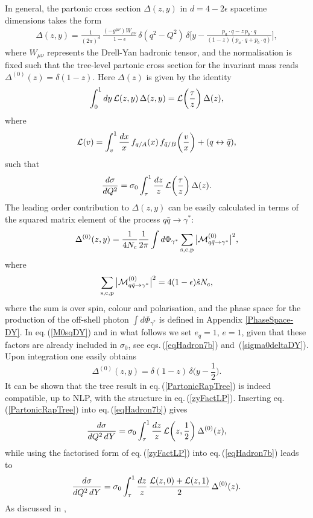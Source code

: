 \documentclass[11pt]{article}
\newcommand{\be}{\begin{equation}}
\newcommand{\ee}{\end{equation}}
\newcommand{\bea}{\begin{eqnarray}}
\newcommand{\eea}{\end{eqnarray}}
\newcommand{\eps}{\epsilon}
\newcommand\eqn[1]     {eq.\,(\ref{#1})}
\newcommand\eqns[2]    {eqs.\,(\ref{#1}) and~(\ref{#2})}
\begin{document}
In general, the partonic cross section 
$\Delta(z,y)$ in $d = 4-2\eps$ spacetime
dimensions takes the form 
\bea\label{PartonicRapidityDef}
\Delta(z,y) =  
\frac{1}{(2\pi)^d}\, 
\frac{(-g^{\mu\nu}) W_{\mu\nu}}{1-\eps}
\, \delta(q^2 - Q^2) \, 
\delta\bigg[y - \frac{p_a \cdot q - z \, p_b \cdot q}{(1-z)
(p_a \cdot q + p_b \cdot q)} \bigg],
\eea
where $W_{\mu\nu}$ represents 
the Drell-Yan hadronic tensor, 
and the normalisation is fixed 
such that the tree-level partonic 
cross section for the invariant 
mass reads $\Delta^{(0)}(z) = 
\delta (1-z)$. Here $\Delta(z)$
is given by the identity
\be
\int_0^1 dy \, 
{\cal L}(z,y) \, \Delta(z,y)
= {\cal L} \bigg(\frac{\tau}{z}\bigg) \, \Delta(z),
\ee
where
\be\label{luminosityInvMass}
{\cal L}(v) = \int_{v}^{1} \frac{dx}{x} 
\, f_{q/A}(x) \, f_{\bar q/B}\bigg(\frac{v}{x}\bigg)
+ (q\leftrightarrow \bar q),
\ee
such that 
\be\label{eqHadron7a}
\frac{d\sigma}{d Q^2} = \sigma_0 \int_{\tau}^{1} \frac{dz}{z} \, 
{\cal L} \bigg(\frac{\tau}{z}\bigg) \, \Delta(z).
\ee
The leading order contribution to 
$\Delta(z,y)$ can be easily calculated
in terms of the squared matrix element 
of the process $q\bar q \to \gamma^*$: 
\be\label{PartonicRapTree0}
\Delta^{(0)}(z,y) =
\frac{1}{4N_c}\frac{1}{2\pi}  
\int d\Phi_{\gamma^*} 
\sum_{\rm s,c,p}
\big|{\cal M}_{q\bar q \to \gamma^*}^{(0)}\big|^2,
\ee
where 
\be\label{M0sqDY}
\sum_{\rm s,c,p} 
\big|{\cal M}_{q\bar q \to \gamma^*}^{(0)}\big|^2 
= 4(1-\eps)\hat s N_c,
\ee
where the sum is over spin, colour and 
polarisation, and the phase space for 
the production of the off-shell photon 
$\int d \Phi_{\gamma^*}$ is defined in 
Appendix \ref{PhaseSpace-DY}. In 
\eqn{M0sqDY} and in what follows we set $e_q =1$, 
$e = 1$, given that these factors are already 
included in $\sigma_0$, see 
\eqns{eqHadron7b}{sigma0deltaDY}. 
Upon integration one easily obtains 
\be\label{PartonicRapTree} 
\Delta^{(0)}(z,y) = \delta(1-z) \, 
\delta\bigg(y - \frac{1}{2} \bigg).
\ee
It can be shown \cite{Bonvini:2012sh} 
that the tree result in \eqn{PartonicRapTree} 
is indeed compatible, up to NLP, with the 
structure in \eqn{zyFactLP}. Inserting 
\eqn{PartonicRapTree} into \eqn{eqHadron7b} 
gives 
\be\label{eqHadron8Tree}
\frac{d\sigma}{d Q^2\, dY} = 
\sigma_0   
\int_{\tau}^{1} \frac{dz}{z} \, 
{\cal L}\bigg(z,\frac{1}{2}\bigg) 
\, \Delta^{(0)}(z),
\ee
while using the factorised form of 
\eqn{zyFactLP} into \eqn{eqHadron7b}
leads to 
\be\label{eqHadron8TreeB}
\frac{d\sigma}{d Q^2\, dY} = 
\sigma_0   
\int_{\tau}^{1} \frac{dz}{z} \, 
\frac{{\cal L}(z,0) + {\cal L}(z,1)}{2} 
\, \Delta^{(0)}(z).
\ee
As discussed in \cite{Bonvini:2012sh}, 
\end{document}
